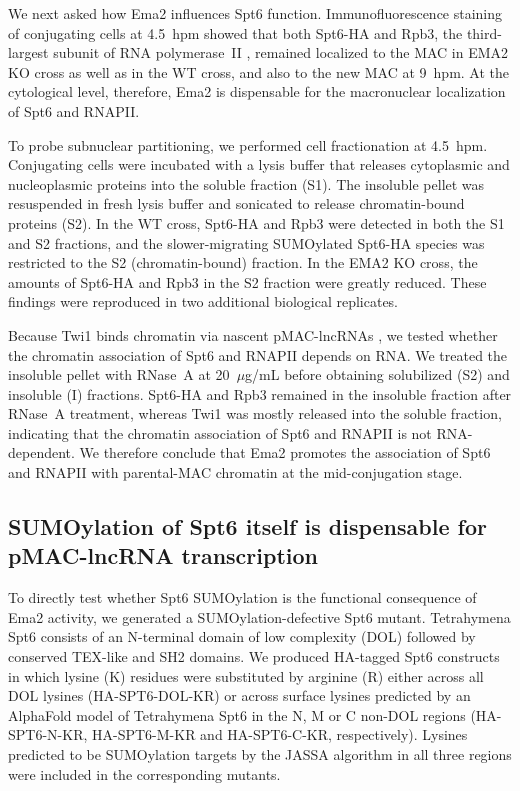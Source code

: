 \documentclass[11pt]{article}
\begin{document}
We next asked how Ema2 influences Spt6 function. Immunofluorescence
staining of conjugating cells at 4.5~hpm showed that both Spt6-HA and
Rpb3, the third-largest subunit of RNA polymerase~II
\citep{mochizuki2004rpb3}, remained localized to the MAC in EMA2 KO
cross as well as in the WT cross, and also to the new MAC at 9~hpm. At
the cytological level, therefore, Ema2 is dispensable for the
macronuclear localization of Spt6 and RNAPII.

To probe subnuclear partitioning, we performed cell fractionation at
4.5~hpm. Conjugating cells were incubated with a lysis buffer that
releases cytoplasmic and nucleoplasmic proteins into the soluble fraction
(S1). The insoluble pellet was resuspended in fresh lysis buffer and
sonicated to release chromatin-bound proteins (S2). In the WT cross,
Spt6-HA and Rpb3 were detected in both the S1 and S2 fractions, and the
slower-migrating SUMOylated Spt6-HA species was restricted to the S2
(chromatin-bound) fraction. In the EMA2 KO cross, the amounts of
Spt6-HA and Rpb3 in the S2 fraction were greatly reduced. These findings
were reproduced in two additional biological replicates.

Because Twi1 binds chromatin via nascent pMAC-lncRNAs
\citep{aronica2008ema1}, we tested whether the chromatin association of
Spt6 and RNAPII depends on RNA. We treated the insoluble pellet with
RNase~A at 20~$\mu$g/mL before obtaining solubilized (S2) and insoluble
(I) fractions. Spt6-HA and Rpb3 remained in the insoluble fraction after
RNase~A treatment, whereas Twi1 was mostly released into the soluble
fraction, indicating that the chromatin association of Spt6 and RNAPII is
not RNA-dependent. We therefore conclude that Ema2 promotes the
association of Spt6 and RNAPII with parental-MAC chromatin at the
mid-conjugation stage.

\subsection{SUMOylation of Spt6 itself is dispensable for pMAC-lncRNA
transcription}

To directly test whether Spt6 SUMOylation is the functional consequence of
Ema2 activity, we generated a SUMOylation-defective Spt6 mutant.
Tetrahymena Spt6 consists of an N-terminal domain of low complexity (DOL)
followed by conserved TEX-like and SH2 domains. We produced HA-tagged Spt6
constructs in which lysine (K) residues were substituted by arginine (R)
either across all DOL lysines (HA-SPT6-DOL-KR) or across surface lysines
predicted by an AlphaFold model of Tetrahymena Spt6 in the N, M or C
non-DOL regions (HA-SPT6-N-KR, HA-SPT6-M-KR and HA-SPT6-C-KR,
respectively). Lysines predicted to be SUMOylation targets by the JASSA
algorithm in all three regions were included in the corresponding mutants.
\end{document}
